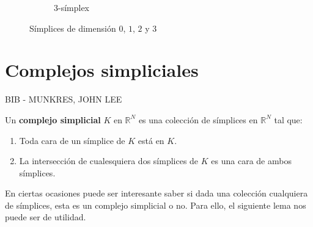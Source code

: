 \begin{figure}[h]
\begin{subfigure}{.24\textwidth}
		\caption{3-símplex}
	\end{subfigure}
	\caption{Símplices de dimensión $0$, $1$, $2$ y $3$}
	\label{fig:simplex}
\end{figure}


\section{Complejos simpliciales}

BIB - MUNKRES, JOHN LEE

\begin{definicion}
	Un \textbf{complejo simplicial} $K$ en $\mathbb{R}^N$ es una colección de símplices en $\mathbb{R}^N$
	 tal que:
	\begin{enumerate}
		\item Toda cara de un símplice de $K$ está en $K$.
		\item La intersección de cualesquiera dos símplices de $K$ es una cara 
		de ambos símplices.
	\end{enumerate}
\end{definicion}

En ciertas ocasiones puede ser interesante saber si dada una colección cualquiera de símplices, esta es 
un complejo simplicial o no. Para ello, el siguiente lema nos puede ser de utilidad.


